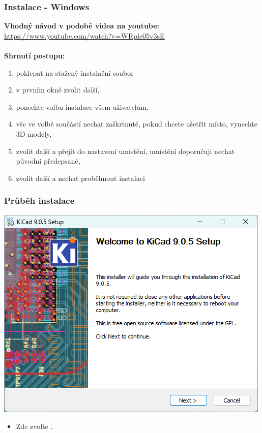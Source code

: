 \documentclass{beamer}
\begin{document}
	\begin{frame}
    \frametitle{Instalace - Windows}
    	\textbf{Vhodný návod v podobě videa na youtube:} \url{https://www.youtube.com/watch?v=WRple05v3sE} \\~\\
    	
    	\textbf{Shrnutí postupu:}
		\begin{enumerate}
			\item poklepat na stažený instalační soubor
			\item v prvním okně zvolit další,
			\item ponechte volbu instalace všem uživatelům,
			\item vše ve volbě součástí nechat zaškrtnuté, pokud chcete ušetřit místo, vynechte 3D modely,
			\item zvolit další a přejít do nastavení umístění, umístění doporučuji nechat původní předepsané,
			\item zvolit další a nechat proběhnout instalaci
		\end{enumerate}
		
	\end{frame}
	\begin{frame}
    \frametitle{Průběh instalace}
		\begin{center}
			\includegraphics[scale=0.5]{obr/kicad_inst1.png}
		\end{center}
		
		\begin{itemize}
			\item Zde zvolte .
		\end{itemize}
	\end{frame}
\end{document}
